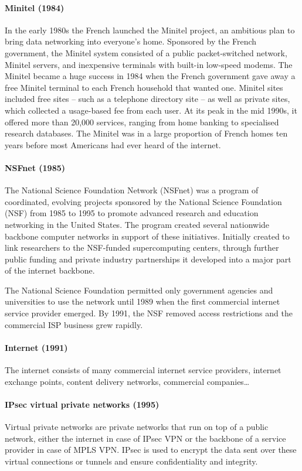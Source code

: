 {\paragraph{Minitel (1984)}
In the early 1980s the French launched the Minitel project, an ambitious plan to bring data networking into everyone’s home.
Sponsored by the French government, the Minitel system consisted of a public packet-switched network, Minitel servers, and inexpensive terminals with built-in low-speed modems.
The Minitel became a huge success in 1984 when the French government gave away a free Minitel terminal to each French household that wanted one.
Minitel sites included free sites -- such as a telephone directory site -- as well as private sites, which collected a usage-based fee from each user.
At its peak in the mid 1990s, it offered more than 20,000 services, ranging from home banking to specialised research databases.
The Minitel was in a large proportion of French homes ten years before most Americans had ever heard of the internet.

\paragraph{NSFnet (1985)}
The National Science Foundation Network (NSFnet) was a program of coordinated, evolving projects sponsored by the National Science Foundation (NSF) from 1985 to 1995 to promote advanced research and education networking in the United States.
The program created several nationwide backbone computer networks in support of these initiatives.
Initially created to link researchers to the NSF-funded supercomputing centers, through further public funding and private industry partnerships it developed into a major part of the internet backbone.

The National Science Foundation permitted only government agencies and universities to use the network until 1989 when the first commercial internet service provider emerged.
By 1991, the NSF removed access restrictions and the commercial ISP business grew rapidly.

\paragraph{Internet (1991)}
The internet consists of many commercial internet service providers, internet exchange points, content delivery networks, commercial companies\ldots

\paragraph{IPsec virtual private networks (1995)}
Virtual private networks are private networks that run on top of a public network, either the internet in case of IPsec VPN or the backbone of a service provider in case of MPLS VPN.
IPsec is used to encrypt the data sent over these virtual connections or tunnels and ensure confidentiality and integrity.

}
